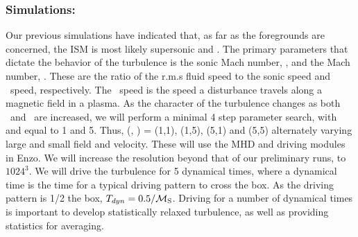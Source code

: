 \subsubsection{Simulations: \nameCMB}
\label{subsec.cmb_sims}

Our previous simulations have indicated that, as far as the foregrounds are
concerned, the ISM is most likely supersonic and \sa.  The primary parameters
that dictate the behavior of the turbulence is the sonic Mach number, \mach,
and the \alf Mach number, \alfmach.  These are the ratio of the r.m.s fluid
speed to the sonic speed and \alf\ speed, respectively.  The \alf\ speed is the
speed a disturbance travels along a magnetic field in a plasma.  As the
character of the turbulence changes as both \mach\ and \alfmach\ are increased,
we will perform a minimal 4 step parameter search, with \mach and \alfmach equal
to 1 and 5.  Thus, (\mach, \alfmach) = (1,1), (1,5), (5,1) and (5,5) alternately
varying large and small field and velocity.  These will use the MHD and driving
modules in Enzo.  We will increase the resolution beyond that of our preliminary
runs, to $1024^3$.  We will drive the turbulence for 5 dynamical times, where a
dynamical time is the time for a typical driving pattern to cross the box.  As
the driving pattern is 1/2 the box, $T_{dyn}=0.5/\mathcal{M_{\rm{S}}}$.  Driving for a number
of dynamical times is important to develop statistically relaxed turbulence, as
well as providing statistics for averaging.  
